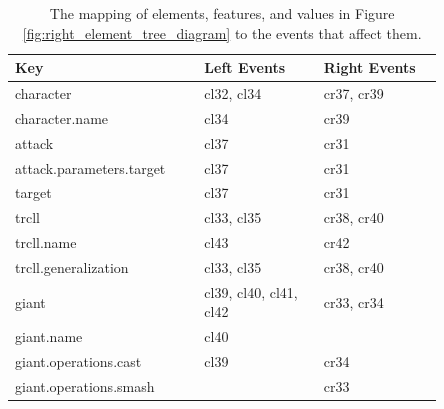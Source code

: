 \begin{table}[ht]
  \centering
  \caption{The mapping of elements, features, and values in Figure \ref{fig:right_element_tree_diagram} to the events that affect them.}
  \label{tab:keyeventsmap}
    \begin{sffamily}
      \begin{tabular}{|m{0.36\linewidth}|m{0.245\linewidth}|m{0.245\linewidth}|}
        \hline
        \textbf{Key} & \textbf{Left Events} & \textbf{Right Events} \\ \hline
        character                          & cl32, cl34                                & cr37, cr39                                 \\ \hline
        character.name                     & cl34                                      & cr39                                       \\ \hline
        attack                             & cl37                                      & cr31                                       \\ \hline
        attack.parameters.target           & cl37                                      & cr31                                       \\ \hline
        target                             & cl37                                      & cr31                                       \\ \hline
        trcll                              & cl33, cl35                                & cr38, cr40                                 \\ \hline
        trcll.name                         & cl43                                      & cr42                                       \\ \hline
        trcll.generalization               & cl33, cl35                                & cr38, cr40                                 \\ \hline
        giant                              & cl39, cl40, cl41, cl42                    & cr33, cr34                                 \\ \hline
        giant.name                         & cl40                                      &                                            \\ \hline
        giant.operations.cast              & cl39                                      & cr34                                       \\ \hline
        giant.operations.smash             &                                           & cr33                                       \\ \hline

\end{tabular}
\end{sffamily}
\end{table}
